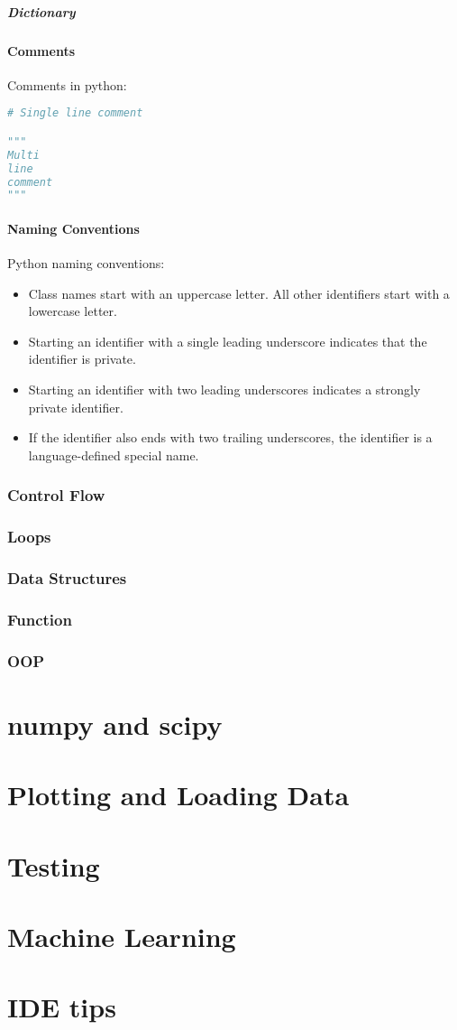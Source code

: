 \documentclass{article}
\begin{document}
\subsubsection{Dictionary}
\subsection{Comments}
Comments in python:
\begin{lstlisting}[language=python]
# Single line comment

"""
Multi
line
comment
"""
\end{lstlisting}

\subsection{Naming Conventions}
Python naming conventions:
\begin{itemize}
\item Class names start with an uppercase letter. All other identifiers start with a lowercase letter.
\item Starting an identifier with a single leading underscore indicates that the identifier is private.
\item Starting an identifier with two leading underscores indicates a strongly private identifier.
\item If the identifier also ends with two trailing underscores, the identifier is a language-defined special name.
\end{itemize}



\section{Control Flow}
\section{Loops}
\section{Data Structures}
\section{Function}
\section{OOP}

\part{numpy and scipy}
\part{Plotting and Loading Data}
\part{Testing}
\part{Machine Learning}
\part{IDE tips}
\end{document}
